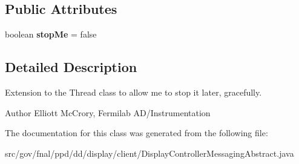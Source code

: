 \subsection*{Public Attributes}
\begin{DoxyCompactItemize}
\item 
\hypertarget{classgov_1_1fnal_1_1ppd_1_1dd_1_1display_1_1client_1_1DisplayControllerMessagingAbstract_1_1ThreadWithStop_a0b29b8779d6f9c197704bc33bbac3efb}{boolean {\bfseries stop\-Me} = false}\label{classgov_1_1fnal_1_1ppd_1_1dd_1_1display_1_1client_1_1DisplayControllerMessagingAbstract_1_1ThreadWithStop_a0b29b8779d6f9c197704bc33bbac3efb}

\end{DoxyCompactItemize}


\subsection{Detailed Description}
Extension to the Thread class to allow me to stop it later, gracefully.

\begin{DoxyAuthor}{Author}
Elliott Mc\-Crory, Fermilab A\-D/\-Instrumentation 
\end{DoxyAuthor}


The documentation for this class was generated from the following file\-:\begin{DoxyCompactItemize}
\item 
src/gov/fnal/ppd/dd/display/client/Display\-Controller\-Messaging\-Abstract.\-java\end{DoxyCompactItemize}
